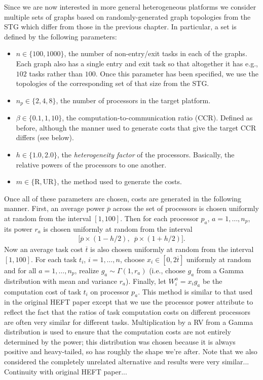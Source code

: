 \documentclass[12pt]{article}
\begin{document}
Since we are now interested in more general heterogeneous platforms we consider multiple sets of graphs based on randomly-generated graph topologies from the STG which differ from those in the previous chapter. In particular, a set is defined by the following parameters:
\begin{itemize}
	\item $n \in \{ 100, 1000 \}$, the number of non-entry/exit tasks in each of the graphs. Each graph also has a single entry and exit task so that altogether it has e.g., $102$ tasks rather than $100$. Once this parameter has been specified, we use the topologies of the corresponding set of that size from the STG. 
	\item $n_p \in \{2, 4, 8\}$, the number of processors in the target platform. 
	\item $\beta \in \{0.1, 1, 10\}$, the computation-to-communication ratio (CCR). Defined as before, although the manner used to generate costs that give the target CCR differs (see below).
	\item $h \in \{1.0, 2.0\}$, the {\em heterogeneity factor} of the processors. Basically, the relative powers of the processors to one another. 
	\item $m \in \{\text{R}, \text{UR} \}$, the method used to generate the costs.
\end{itemize}
Once all of these parameters are chosen, costs are generated in the following manner. First, an average power $\overline{p}$ across the set of processors is chosen uniformly at random from the interval $[1, 100]$. Then for each processor $p_a$, $a = 1, \dots, n_p$, its power $r_a$ is chosen uniformly at random from the interval
\begin{align*}
\big[ \overline{p} \times (1 - h/2), \enspace \overline{p} \times (1 + h/2)     \big].
\end{align*}  
Now an average task cost $\overline{t}$ is also chosen uniformly at random from the interval $[1, 100]$. For each task $t_i$, $i = 1, \dots, n$, choose $x_i \in [0, 2\overline{t}]$ uniformly at random and for all $a = 1, \dots, n_p$, realize $g_a \sim \Gamma(1, r_a)$ (i.e., choose $g_a$ from a Gamma distribution with mean and variance $r_a$). Finally, let $W_i^a = x_i g_a$ be the computation cost of task $t_i$ on processor $p_a$. This method is similar to that used in the original HEFT paper \cite{topcuoglu2002performance} except that we use the processor power attribute to reflect the fact that the ratios of task computation costs on different processors are often very similar for different tasks. Multiplication by a RV from a Gamma distribution is used to ensure that the computation costs are not entirely determined by the power; this distribution was chosen because it is always positive and heavy-tailed, so has roughly the shape we're after. Note that we also considered the completely unrelated alternative and results were very similar... Continuity with original HEFT paper...
\end{document}
